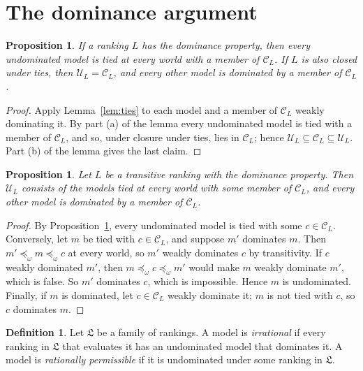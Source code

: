 \documentclass[11pt]{article}
\newtheorem{proposition}[theorem]{Proposition}
\theoremstyle{definition}
\newtheorem{definition}[theorem]{Definition}
\newcommand{\C}{\mathcal C}
\newcommand{\U}{\mathcal U}
\newcommand{\Lf}{\mathfrak L}
\begin{document}
\section{The dominance argument}\label{sec:conclusion}

\begin{proposition}\label{prop:conclusion}
If a ranking $L$ has the dominance property, then every undominated model is tied at every world with a member of $\C_L$. If $L$ is also closed under ties, then $\U_L=\C_L$, and every other model is dominated by a member of $\C_L$.
\end{proposition}
\begin{proof}
Apply Lemma~\ref{lem:ties} to each model and a member of $\C_L$ weakly dominating it. By part (a) of the lemma every undominated model is tied with a member of $\C_L$, and so, under closure under ties, lies in $\C_L$; hence $\U_L\subseteq\C_L\subseteq\U_L$. Part (b) of the lemma gives the last claim.
\end{proof}

\begin{proposition}\label{prop:profiles}
Let $L$ be a transitive ranking with the dominance property. Then $\U_L$ consists of the models tied at every world with some member of $\C_L$, and every other model is dominated by a member of $\C_L$.
\end{proposition}
\begin{proof}
By Proposition~\ref{prop:conclusion}, every undominated model is tied with some $c\in\C_L$. Conversely, let $m$ be tied with $c\in\C_L$, and suppose $m'$ dominates $m$. Then $m'\preceq_\omega m\preceq_\omega c$ at every world, so $m'$ weakly dominates $c$ by transitivity. If $c$ weakly dominated $m'$, then $m\preceq_\omega c\preceq_\omega m'$ would make $m$ weakly dominate $m'$, which is false. So $m'$ dominates $c$, which is impossible. Hence $m$ is undominated. Finally, if $m$ is dominated, let $c\in\C_L$ weakly dominate it; $m$ is not tied with $c$, so $c$ dominates $m$.
\end{proof}

\begin{definition}\label{def:permissibility}
Let $\Lf$ be a family of rankings. A model is \emph{irrational} if every ranking in $\Lf$ that evaluates it has an undominated model that dominates it. A model is \emph{rationally permissible} if it is undominated under some ranking in $\Lf$.
\end{definition}
\end{document}
